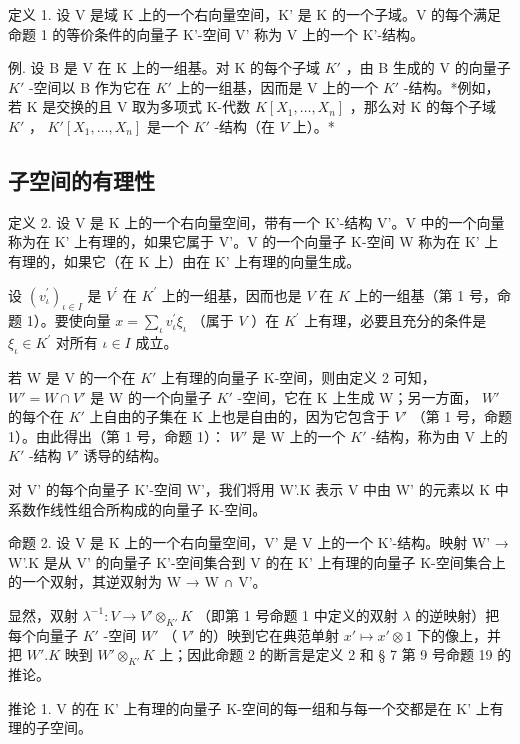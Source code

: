 定义 1. 设 V 是域 K 上的一个右向量空间，K' 是 K 的一个子域。V 的每个满足命题 1 的等价条件的向量子 K'-空间 V' 称为 V 上的一个 K'-结构。

例. 设 B 是 V 在 K 上的一组基。对 K 的每个子域 \(K'\) ，由 B 生成的 V 的向量子 \(K'\) -空间以 B 作为它在 \(K'\) 上的一组基，因而是 V 上的一个 \(K'\) -结构。*例如，若 K 是交换的且 V 取为多项式 K-代数 \(K[X_{1},\ldots,X_{n}]\) ，那么对 K 的每个子域 \(K'\) ， \(K'[X_{1},\ldots,X_{n}]\) 是一个 \(K'\) -结构（在 \(V\) 上）。*

\subsection{子空间的有理性}

定义 2. 设 V 是 K 上的一个右向量空间，带有一个 K'-结构 V'。V 中的一个向量称为在 K' 上有理的，如果它属于 V'。V 的一个向量子 K-空间 W 称为在 K' 上有理的，如果它（在 K 上）由在 K' 上有理的向量生成。

设 \((v_{\iota}^{\prime})_{\iota\in I}\) 是 \(V^{\prime}\) 在 \(K^{\prime}\) 上的一组基，因而也是 \(V\) 在 \(K\) 上的一组基（第 1 号，命题 1）。要使向量 \(x = \sum_{\iota} v_{\iota}^{\prime} \xi_{\iota}\) （属于 \(V\) ）在 \(K^{\prime}\) 上有理，必要且充分的条件是 \(\xi_{\iota} \in K^{\prime}\) 对所有 \(\iota \in I\) 成立。

若 W 是 V 的一个在 \(K'\) 上有理的向量子 K-空间，则由定义 2 可知， \(W' = W \cap V'\) 是 W 的一个向量子 \(K'\) -空间，它在 K 上生成 W；另一方面， \(W'\) 的每个在 \(K'\) 上自由的子集在 K 上也是自由的，因为它包含于 \(V'\) （第 1 号，命题 1）。由此得出（第 1 号，命题 1）： \(W'\) 是 W 上的一个 \(K'\) -结构，称为由 V 上的 \(K'\) -结构 \(V'\) 诱导的结构。

对 V' 的每个向量子 K'-空间 W'，我们将用 W'.K 表示 V 中由 W' 的元素以 K 中系数作线性组合所构成的向量子 K-空间。

命题 2. 设 V 是 K 上的一个右向量空间，V' 是 V 上的一个 K'-结构。映射 W' → W'.K 是从 V' 的向量子 K'-空间集合到 V 的在 K' 上有理的向量子 K-空间集合上的一个双射，其逆双射为 W → W ∩ V'。

显然，双射 \(\lambda^{-1}: V \to V' \otimes_{K'} K\) （即第 1 号命题 1 中定义的双射 \(\lambda\) 的逆映射）把每个向量子 \(K'\) -空间 \(W'\) （ \(V'\) 的）映到它在典范单射 \(x' \mapsto x' \otimes 1\) 下的像上，并把 \(W'. K\) 映到 \(W' \otimes_{K'} K\) 上；因此命题 2 的断言是定义 2 和 § 7 第 9 号命题 19 的推论。

推论 1. V 的在 K' 上有理的向量子 K-空间的每一组和与每一个交都是在 K' 上有理的子空间。


